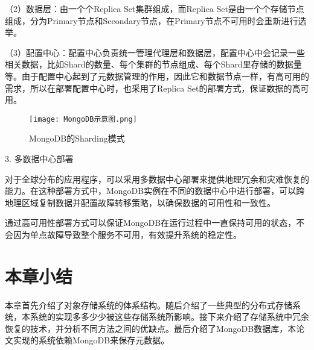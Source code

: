 （2）数据层：由一个个Replica Set集群组成，而Replica Set是由一个个存储节点组成，分为Primary节点和Secondary节点，在Primary节点不可用时会重新进行选举。

（3）配置中心：配置中心负责统一管理代理层和数据层，配置中心中会记录一些相关数据，比如Shard的数量、每个集群的节点组成、每个Shard里存储的数据量等。由于配置中心起到了元数据管理的作用，因此它和数据节点一样，有高可用的需求，所以在部署配置中心时，也采用了Replica Set的部署方式，保证数据的高可用。

\begin{figure}[h]
    \centering
    \texttt{[image: MongoDB示意图.png]}
    \caption{MongoDB的Sharding模式}
\end{figure}

3. 多数据中心部署

对于全球分布的应用程序，可以采用多数据中心部署来提供地理冗余和灾难恢复的能力。在这种部署方式中，MongoDB实例在不同的数据中心中进行部署，可以跨地理区域复制数据并配置故障转移策略，以确保数据的可用性和一致性。

通过高可用性部署方式可以保证MongoDB在运行过程中一直保持可用的状态，不会因为单点故障导致整个服务不可用，有效提升系统的稳定性。

\section{本章小结}%
本章首先介绍了对象存储系统的体系结构。随后介绍了一些典型的分布式存储系统，本系统的实现多多少少被这些存储系统所影响。接下来介绍了存储系统中冗余恢复的技术，并分析不同方法之间的优缺点。最后介绍了MongoDB数据库，本论文实现的系统依赖MongoDB来保存元数据。
